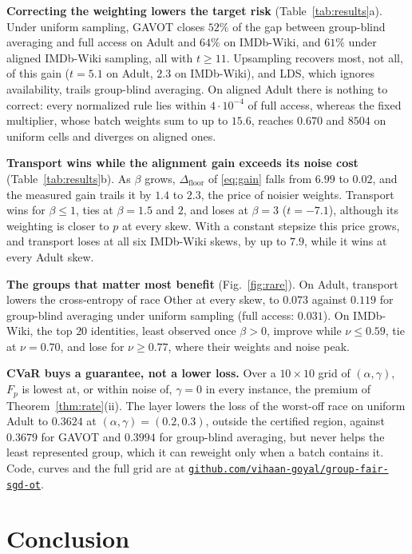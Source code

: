 \documentclass{article}
\theoremstyle{definition}
\newcommand{\avot}{\textsf{GAVOT}}
\begin{document}
\noindent\textbf{Correcting the weighting lowers the target risk}
(Table~\ref{tab:results}a). Under uniform sampling, \avot{} closes $52\%$
of the gap between group-blind averaging and full access on Adult and
$64\%$ on IMDb-Wiki, and $61\%$ under aligned IMDb-Wiki sampling, all with $t\ge11$. Upsampling recovers most, not all, of this gain ($t=5.1$ on Adult, $2.3$ on IMDb-Wiki), and LDS, which ignores
availability, trails group-blind averaging. On aligned Adult there is nothing to correct: every normalized rule lies within $4\cdot10^{-4}$
of full access, whereas the fixed multiplier, whose batch weights sum to up to
$15.6$, reaches $0.670$ and $8504$ on uniform cells and diverges on aligned
ones.

\noindent\textbf{Transport wins while the alignment gain exceeds its noise
cost} (Table~\ref{tab:results}b). As $\beta$ grows,
$\Delta_{\mathrm{floor}}$ of \eqref{eq:gain} falls from $6.99$ to $0.02$,
and the measured gain trails it by $1.4$ to $2.3$, the price of noisier
weights. Transport wins for $\beta\le1$, ties at $\beta=1.5$
and $2$, and loses at $\beta=3$ ($t=-7.1$), although its weighting is
closer to $p$ at every skew. With a constant stepsize this price grows,
and transport loses at all six IMDb-Wiki skews, by up to $7.9$, while it wins at every
Adult skew.

\noindent\textbf{The groups that matter most benefit} (Fig.~\ref{fig:rare}).
On Adult, transport lowers the cross-entropy of race Other at every skew,
to $0.073$ against $0.119$ for group-blind averaging under uniform
sampling (full access: $0.031$). On IMDb-Wiki, the top $20$ identities, least observed once $\beta>0$, improve while $\nu\le0.59$, tie at $\nu=0.70$, and lose for $\nu\ge0.77$, where their weights
and noise peak.

\noindent\textbf{CVaR buys a guarantee, not a lower loss.} Over a
$10\times10$ grid of $(\alpha,\gamma)$, $F_p$ is lowest at, or within
noise of, $\gamma=0$ in every instance, the premium of
Theorem~\ref{thm:rate}(ii). The layer lowers the loss of the worst-off
race on uniform Adult to $0.3624$ at $(\alpha,\gamma)=(0.2,0.3)$, outside
the certified region, against $0.3679$ for \avot{} and $0.3994$ for
group-blind averaging, but never helps the least represented group, which
it can reweight only when a batch contains it. Code, curves and the full
grid are at
\href{https://github.com/vihaan-goyal/group-fair-sgd-ot}{\nolinkurl{github.com/vihaan-goyal/group-fair-sgd-ot}}.

\vspace{-10pt}\section{Conclusion}
\vspace{-5pt}%
\end{document}
